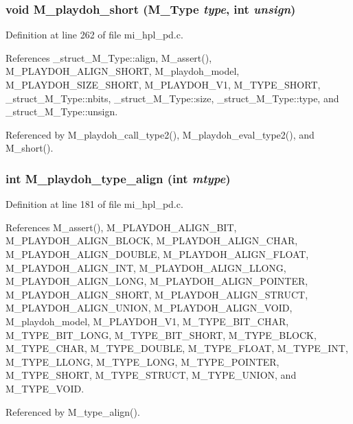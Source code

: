 \subsubsection{\setlength{\rightskip}{0pt plus 5cm}void M\_\-playdoh\_\-short (\bf{M\_\-Type} {\em type}, int {\em unsign})}\label{mi__hpl__pd_8c_ffe17d51eb3d6f65e38a01dbb3497c81}




Definition at line 262 of file mi\_\-hpl\_\-pd.c.

References \_\-struct\_\-M\_\-Type::align, M\_\-assert(), M\_\-PLAYDOH\_\-ALIGN\_\-SHORT, M\_\-playdoh\_\-model, M\_\-PLAYDOH\_\-SIZE\_\-SHORT, M\_\-PLAYDOH\_\-V1, M\_\-TYPE\_\-SHORT, \_\-struct\_\-M\_\-Type::nbits, \_\-struct\_\-M\_\-Type::size, \_\-struct\_\-M\_\-Type::type, and \_\-struct\_\-M\_\-Type::unsign.

Referenced by M\_\-playdoh\_\-call\_\-type2(), M\_\-playdoh\_\-eval\_\-type2(), and M\_\-short().
\subsubsection{\setlength{\rightskip}{0pt plus 5cm}int M\_\-playdoh\_\-type\_\-align (int {\em mtype})}\label{mi__hpl__pd_8c_30811a0a26c2393668a91900e5d3696f}




Definition at line 181 of file mi\_\-hpl\_\-pd.c.

References M\_\-assert(), M\_\-PLAYDOH\_\-ALIGN\_\-BIT, M\_\-PLAYDOH\_\-ALIGN\_\-BLOCK, M\_\-PLAYDOH\_\-ALIGN\_\-CHAR, M\_\-PLAYDOH\_\-ALIGN\_\-DOUBLE, M\_\-PLAYDOH\_\-ALIGN\_\-FLOAT, M\_\-PLAYDOH\_\-ALIGN\_\-INT, M\_\-PLAYDOH\_\-ALIGN\_\-LLONG, M\_\-PLAYDOH\_\-ALIGN\_\-LONG, M\_\-PLAYDOH\_\-ALIGN\_\-POINTER, M\_\-PLAYDOH\_\-ALIGN\_\-SHORT, M\_\-PLAYDOH\_\-ALIGN\_\-STRUCT, M\_\-PLAYDOH\_\-ALIGN\_\-UNION, M\_\-PLAYDOH\_\-ALIGN\_\-VOID, M\_\-playdoh\_\-model, M\_\-PLAYDOH\_\-V1, M\_\-TYPE\_\-BIT\_\-CHAR, M\_\-TYPE\_\-BIT\_\-LONG, M\_\-TYPE\_\-BIT\_\-SHORT, M\_\-TYPE\_\-BLOCK, M\_\-TYPE\_\-CHAR, M\_\-TYPE\_\-DOUBLE, M\_\-TYPE\_\-FLOAT, M\_\-TYPE\_\-INT, M\_\-TYPE\_\-LLONG, M\_\-TYPE\_\-LONG, M\_\-TYPE\_\-POINTER, M\_\-TYPE\_\-SHORT, M\_\-TYPE\_\-STRUCT, M\_\-TYPE\_\-UNION, and M\_\-TYPE\_\-VOID.

Referenced by M\_\-type\_\-align().
